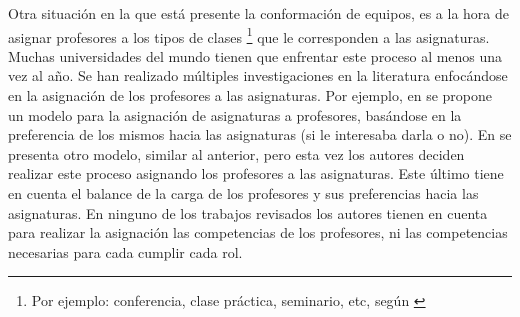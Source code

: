 Otra situación en la que está presente la conformación de equipos, es a la hora de asignar profesores a los tipos de clases \footnote{Por ejemplo: conferencia, clase práctica, seminario, etc, según \cite{res2018}} que le corresponden a las asignaturas. Muchas universidades del mundo tienen que enfrentar este proceso al menos una vez al año. Se han realizado múltiples investigaciones en la literatura enfocándose en la asignación de los profesores a las asignaturas. Por ejemplo, en \cite{Bosquez2020} se propone un modelo para la asignación de asignaturas a profesores, basándose en la preferencia de los mismos hacia las asignaturas (si le interesaba darla o no). En \cite{Domenech2014} se presenta otro modelo, similar al anterior, pero esta vez los autores deciden realizar este proceso asignando los profesores a las asignaturas. Este último tiene en cuenta el balance de la carga de los profesores y sus preferencias hacia las asignaturas. En ninguno de los trabajos revisados los autores tienen en cuenta para realizar la asignación las competencias de los profesores, ni las competencias necesarias para cada cumplir cada rol.\\

